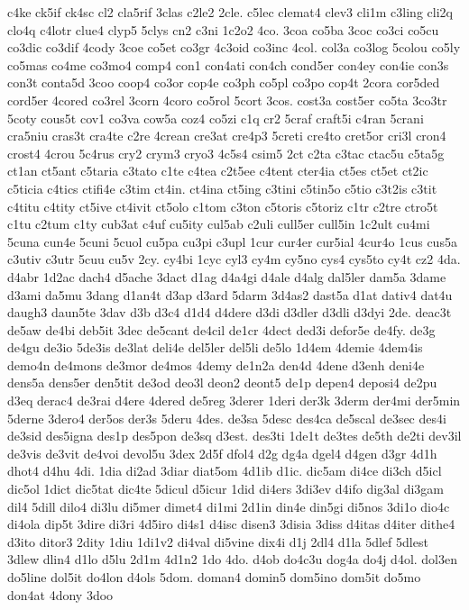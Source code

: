 {c4ke
ck5if
ck4sc
cl2
cla5rif
3clas
c2le2
2cle.
c5lec
clemat4
clev3
cli1m
c3ling
cli2q
clo4q
c4lotr
clue4
clyp5
5clys
cn2
c3ni
1c2o2
4co.
3coa
co5ba
3coc
co3ci
co5cu
co3dic
co3dif
4cody
3coe
co5et
co3gr
4c3oid
co3inc
4col.
col3a
co3log
5colou
co5ly
co5mas
co4me
co3mo4
comp4
con1
con4ati
con4ch
cond5er
con4ey
con4ie
con3s
con3t
conta5d
3coo
coop4
co3or
cop4e
co3ph
co5pl
co3po
cop4t
2cora
cor5ded
cord5er
4cored
co3rel
3corn
4coro
co5rol
5cort
3cos.
cost3a
cost5er
co5ta
3co3tr
5coty
cous5t
cov1
co3va
cow5a
coz4
co5zi
c1q
cr2
5craf
craft5i
c4ran
5crani
cra5niu
cras3t
cra4te
c2re
4crean
cre3at
cre4p3
5creti
cre4to
cret5or
cri3l
cron4
crost4
4crou
5c4rus
cry2
crym3
cryo3
4c5s4
csim5
2ct
c2ta
c3tac
ctac5u
c5ta5g
ct1an
ct5ant
c5taria
c3tato
c1te
c4tea
c2t5ee
c4tent
cter4ia
ct5es
ct5et
ct2ic
c5ticia
c4tics
ctifi4e
c3tim
ct4in.
ct4ina
ct5ing
c3tini
c5tin5o
c5tio
c3t2is
c3tit
c4titu
c4tity
ct5ive
ct4ivit
ct5olo
c1tom
c3ton
c5toris
c5toriz
c1tr
c2tre
ctro5t
c1tu
c2tum
c1ty
cub3at
c4uf
cu5ity
cul5ab
c2uli
cull5er
cull5in
1c2ult
cu4mi
5cuna
cun4e
5cuni
5cuol
cu5pa
cu3pi
c3upl
1cur
cur4er
cur5ial
4cur4o
1cus
cus5a
c3utiv
c3utr
5cuu
cu5v
2cy.
cy4bi
1cyc
cyl3
cy4m
cy5no
cys4
cys5to
cy4t
cz2
4da.
d4abr
1d2ac
dach4
d5ache
3dact
d1ag
d4a4gi
d4ale
d4alg
dal5ler
dam5a
3dame
d3ami
da5mu
3dang
d1an4t
d3ap
d3ard
5darm
3d4as2
dast5a
d1at
dativ4
dat4u
daugh3
daun5te
3dav
d3b
d3c4
d1d4
d4dere
d3di
d3dler
d3dli
d3dyi
2de.
deac3t
de5aw
de4bi
deb5it
3dec
de5cant
de4cil
de1cr
4dect
ded3i
defor5e
de4fy.
de3g
de4gu
de3io
5de3is
de3lat
deli4e
del5ler
del5li
de5lo
1d4em
4demie
4dem4is
demo4n
de4mons
de3mor
de4mos
4demy
de1n2a
den4d
4dene
d3enh
deni4e
dens5a
dens5er
den5tit
de3od
deo3l
deon2
deont5
de1p
depen4
deposi4
de2pu
d3eq
derac4
de3rai
d4ere
4dered
de5reg
3derer
1deri
der3k
3derm
der4mi
der5min
5derne
3dero4
der5os
der3s
5deru
4des.
de3sa
5desc
des4ca
de5scal
de3sec
des4i
de3sid
des5igna
des1p
des5pon
de3sq
d3est.
des3ti
1de1t
de3tes
de5th
de2ti
dev3il
de3vis
de3vit
de4voi
devol5u
3dex
2d5f
dfol4
d2g
dg4a
dgel4
d4gen
d3gr
4d1h
dhot4
d4hu
4di.
1dia
di2ad
3diar
diat5om
4d1ib
d1ic.
dic5am
di4ce
di3ch
d5icl
dic5ol
1dict
dic5tat
dic4te
5dicul
d5icur
1did
di4ers
3di3ev
d4ifo
dig3al
di3gam
dil4
5dill
dilo4
di3lu
di5mer
dimet4
di1mi
2d1in
din4e
din5gi
di5nos
3di1o
dio4c
di4ola
dip5t
3dire
di3ri
4d5iro
di4s1
d4isc
disen3
3disia
3diss
d4itas
d4iter
dithe4
d3ito
ditor3
2dity
1diu
1di1v2
di4val
di5vine
dix4i
d1j
2dl4
d1la
5dlef
5dlest
3dlew
dlin4
d1lo
d5lu
2d1m
4d1n2
1do
4do.
d4ob
do4c3u
dog4a
do4j
d4ol.
dol3en
do5line
dol5it
do4lon
d4ols
5dom.
doman4
domin5
dom5ino
dom5it
do5mo
don4at
4dony
3doo
}
